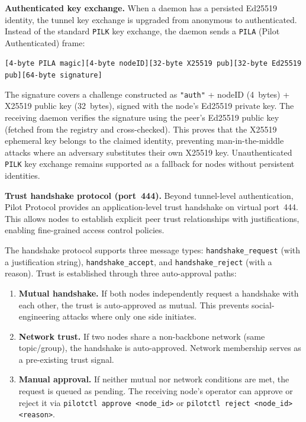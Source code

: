 \documentclass[11pt,a4paper]{article}
\begin{document}
\textbf{Authenticated key exchange.} When a daemon has a persisted Ed25519 identity, the tunnel key exchange is upgraded from anonymous to authenticated. Instead of the standard \texttt{PILK} key exchange, the daemon sends a \texttt{PILA} (Pilot Authenticated) frame:

\begin{center}
\texttt{[4-byte PILA magic][4-byte nodeID][32-byte X25519 pub][32-byte Ed25519 pub][64-byte signature]}
\end{center}

The signature covers a challenge constructed as \texttt{"auth"} + nodeID (4~bytes) + X25519 public key (32~bytes), signed with the node's Ed25519 private key. The receiving daemon verifies the signature using the peer's Ed25519 public key (fetched from the registry and cross-checked). This proves that the X25519 ephemeral key belongs to the claimed identity, preventing man-in-the-middle attacks where an adversary substitutes their own X25519 key. Unauthenticated \texttt{PILK} key exchange remains supported as a fallback for nodes without persistent identities.

\textbf{Trust handshake protocol (port~444).} Beyond tunnel-level authentication, Pilot Protocol provides an application-level trust handshake on virtual port~444. This allows nodes to establish explicit peer trust relationships with justifications, enabling fine-grained access control policies.

The handshake protocol supports three message types: \texttt{handshake\_request} (with a justification string), \texttt{handshake\_accept}, and \texttt{handshake\_reject} (with a reason). Trust is established through three auto-approval paths:

\begin{enumerate}
    \item \textbf{Mutual handshake.} If both nodes independently request a handshake with each other, the trust is auto-approved as mutual. This prevents social-engineering attacks where only one side initiates.
    \item \textbf{Network trust.} If two nodes share a non-backbone network (same topic/group), the handshake is auto-approved. Network membership serves as a pre-existing trust signal.
    \item \textbf{Manual approval.} If neither mutual nor network conditions are met, the request is queued as pending. The receiving node's operator can approve or reject it via \texttt{pilotctl approve <node\_id>} or \texttt{pilotctl reject <node\_id> <reason>}.
\end{enumerate}
\end{document}
